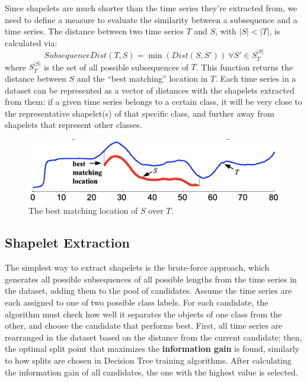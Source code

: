 Since shapelets are much shorter than the time series they're extracted from, we need to define a measure to evaluate the similarity between a subsequence and a time series. The distance between two time series $T$ and $S$, with $|S| < |T|$, is calculated via:
\begin{equation*}
    SubsequenceDist(T,S) = \min(Dist(S,S')) \ \forall S' \in S_T^{|S|}
\end{equation*}
where $S_T^{|S|}$ is the set of all possible subsequences of $T$. This function returns the distance between $S$ and the ``best matching'' location in $T$. Each time series in a dataset can be represented as a vector of distances with the shapelets extracted from them: if a given time series belongs to a certain class, it will be very close to the representative shapelet(s) of that specific class, and further away from shapelets that represent other classes.

\begin{figure}[h]
    \centering
    \includegraphics[width=0.5\linewidth]{img/subsequencedist.png}
    \caption{The best matching location of $S$ over $T$.}
    \label{fig:subseq-dist}
\end{figure}

\subsection{Shapelet Extraction}

The simplest way to extract shapelets is the brute-force approach, which generates all possible subsequences of all possible lengths from the time series in the dataset, adding them to the pool of candidates. Assume the time series are each assigned to one of two possible class labels. For each candidate, the algorithm must check how well it separates the objects of one class from the other, and choose the candidate that performs best. First, all time series are rearranged in the dataset based on the distance from the current candidate; then, the optimal split point that maximizes the \textbf{information gain} is found, similarly to how splits are chosen in Decision Tree training algorithms. After calculating the information gain of all candidates, the one with the highest value is selected.

